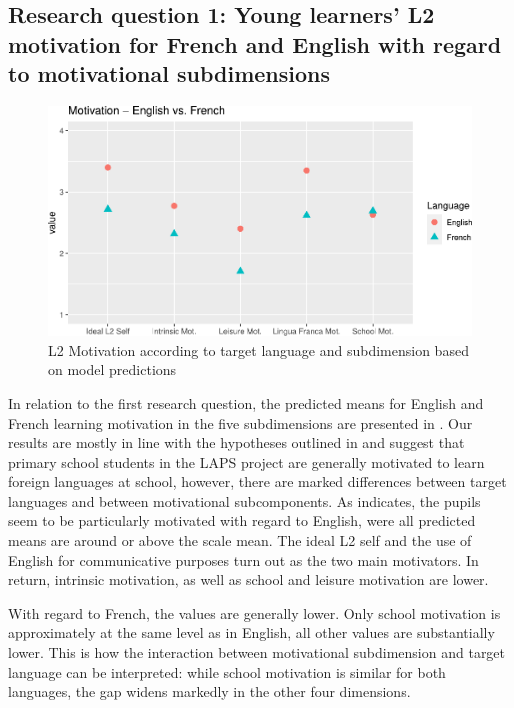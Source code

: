 \documentclass[output=paper]{langsci/langscibook}
\begin{document}
\subsection{Research question 1: Young learners’ L2 motivation for French and English with regard to motivational subdimensions}\label{sec:07:5.1}

  
\begin{figure}
\includegraphics[width=\textwidth]{figures/Fig7.1.pdf}
\caption{L2 Motivation according to target language and subdimension based on model predictions\label{fig:07:1}}
\end{figure}

In relation to the first research question, the predicted means for English and French learning motivation in the five subdimensions are presented in . Our results are mostly in line with the hypotheses outlined in  and suggest that primary school students in the LAPS project are generally motivated to learn foreign languages at school, however, there are marked differences between target languages and between motivational subcomponents. As  indicates, the pupils seem to be particularly motivated with regard to English, were all predicted means are around or above the scale mean. The ideal L2 self and the use of English for communicative purposes turn out as the two main motivators. In return, intrinsic motivation, as well as school and leisure motivation are lower. 

With regard to French, the values are generally lower. Only school motivation is approximately at the same level as in English, all other values are substantially lower. This is how the interaction between motivational subdimension and target language can be interpreted: while school motivation is similar for both languages, the gap widens markedly in the other four dimensions.
\end{document}

